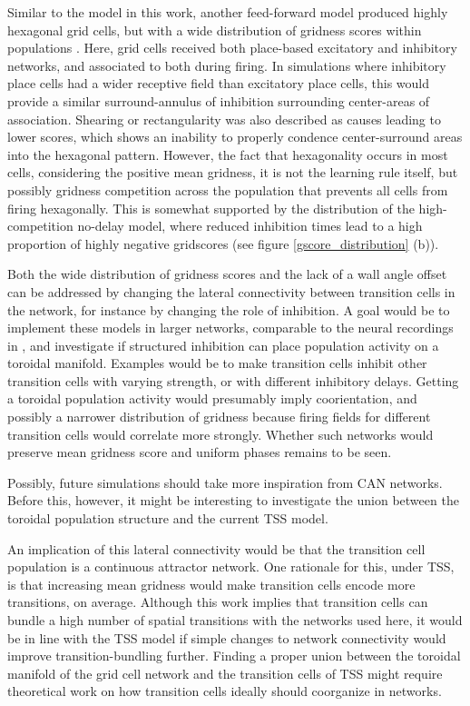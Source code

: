 \documentclass{article}
\begin{document}
    Similar to the model in this work, another feed-forward model produced highly hexagonal grid cells, but with a wide distribution of gridness scores within populations \parencite{Weber2018}. Here, grid cells received both place-based excitatory and inhibitory networks, and associated to both during firing. In simulations where inhibitory place cells had a wider receptive field than excitatory place cells, this would provide a similar surround-annulus of inhibition surrounding center-areas of association. Shearing or rectangularity was also described as causes leading to lower scores, which shows an inability to properly condence center-surround areas into the hexagonal pattern. However, the fact that hexagonality occurs in most cells, considering the positive mean gridness, it is not the learning rule itself, but possibly gridness competition across the population that prevents all cells from firing hexagonally. This is somewhat supported by the distribution of the high-competition no-delay model, where reduced inhibition times lead to a high proportion of highly negative gridscores (see figure \ref{gscore_distribution} (b)).

    Both the wide distribution of gridness scores and the lack of a wall angle offset can be addressed by changing the lateral connectivity between transition cells in the network, for instance by changing the role of inhibition. A goal would be to implement these models in larger networks, comparable to the neural recordings in \parencite{Gardner2022}, and investigate if structured inhibition can place population activity on a toroidal manifold. Examples would be to make transition cells inhibit other transition cells with varying strength, or with different inhibitory delays. Getting a toroidal population activity would presumably imply coorientation, and possibly a narrower distribution of gridness because firing fields for different transition cells would correlate more strongly. Whether such networks would preserve mean gridness score and uniform phases remains to be seen.

    Possibly, future simulations should take more inspiration from CAN networks. Before this, however, it might be interesting to investigate the union between the toroidal population structure and the current TSS model. 
    
    An implication of this lateral connectivity would be that the transition cell population is a continuous attractor network. One rationale for this, under TSS, is that increasing mean gridness would make transition cells encode more transitions, on average. Although this work implies that transition cells can bundle a high number of spatial transitions with the networks used here, it would be in line with the TSS model if simple changes to network connectivity would improve transition-bundling further. Finding a proper union between the toroidal manifold of the grid cell network and the transition cells of TSS might require theoretical work on how transition cells ideally should coorganize in networks.
    
\end{document}
